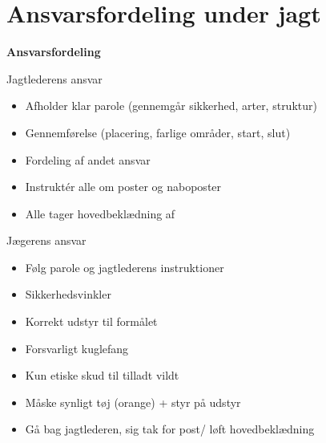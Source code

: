 \section{Ansvarsfordeling under jagt}

\begin{frame}
  \vspace{3em}
  \begin{center}
    {\LARGE \textbf{Ansvarsfordeling}
    }
    \\
    \vspace{1em}
  \end{center}
\end{frame}

\begin{frame}{Jagtlederens ansvar}
    \begin{itemize}
        \item Afholder klar parole (gennemgår sikkerhed, arter, struktur)
        \item Gennemførelse (placering, farlige områder, start, slut)
        \item Fordeling af andet ansvar
        \item Instruktér alle om poster og naboposter
        \item Alle tager hovedbeklædning af
    \end{itemize}
\end{frame}

\begin{frame}{Jægerens ansvar}
    \begin{itemize}
        \item Følg parole og jagtlederens instruktioner
        \item Sikkerhedsvinkler
        \item Korrekt udstyr til formålet
        \item Forsvarligt kuglefang
        \item Kun etiske skud til tilladt vildt
        \item Måske synligt tøj (orange) + styr på udstyr
        \item Gå bag jagtlederen, sig tak for post/ løft hovedbeklædning
    \end{itemize}
\end{frame}